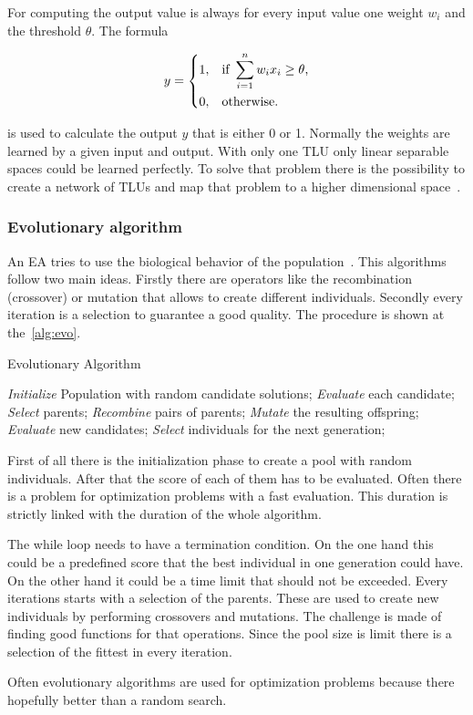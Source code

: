 For computing the output value is always for every input value one weight $w_i$ and the threshold $\theta$. The formula 

\begin{equation}
    y = 
\begin{dcases}
    1, & \text{if } \sum_{i=1}^n w_{i} x_{i} \geq \theta \text{,} \\
    0, & \text{otherwise.}
\end{dcases}
\end{equation}

is used to calculate the output $y$ that is either 0 or 1.
Normally the weights are learned by a given input and output. With only one \ac{TLU} only linear separable spaces could be learned perfectly.
To solve that problem there is the possibility to create a network of \acp{TLU} and map that problem to a higher dimensional space~\cite{ci_kruse}.


\subsubsection{Evolutionary algorithm} 
An \ac{EA} tries to use the biological behavior of the population~\cite{evo}. 
This algorithms follow two main ideas. Firstly there are operators like the recombination (crossover) or
mutation that allows to create different individuals. Secondly every iteration is a selection to guarantee
a good quality.
The procedure is shown at the~\cref{alg:evo}. 


\begin{algorithm}
\caption{Evolutionary Algorithm~\cite{evo}}
\label{alg:evo}
\begin{algorithmic}
\State \emph{Initialize} Population with random candidate solutions;
\State \emph{Evaluate} each candidate;
\State \emph{Select} parents;
\State \emph{Recombine} pairs of parents;
\State \emph{Mutate} the resulting offspring;
\State \emph{Evaluate} new candidates;
\State \emph{Select} individuals for the next generation;
\EndWhile
\end{algorithmic}
\end{algorithm}

First of all there is the initialization phase to create a pool with random
individuals. After that the score of each of them has to be evaluated. Often there
is a problem for optimization problems with a fast evaluation. This duration is
strictly linked with the duration of the whole algorithm.

The while loop needs to have a termination condition. On the one hand this could be
a predefined score that the best individual in one generation could have. On the other 
hand it could be a time limit that should not be exceeded.
Every iterations starts with a selection of the parents.
These are used to create new individuals by performing crossovers and mutations.
The challenge is made of finding good functions for that operations. 
Since the pool size is limit there is a selection of the fittest in every iteration.

Often evolutionary algorithms are used for optimization problems because there
hopefully better than a random search.

